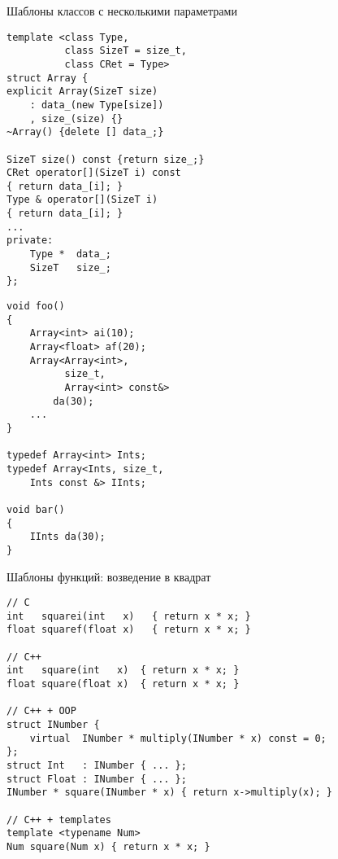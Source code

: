 \documentclass{beamer}
\begin{document}
\begin{frame}[fragile]{Шаблоны классов с несколькими параметрами}
\small
\begin{minipage}{.5\textwidth}
    \begin{lstlisting}
template <class Type, 
          class SizeT = size_t, 
          class CRet = Type>
struct Array {                               
explicit Array(SizeT size)      
    : data_(new Type[size])     
    , size_(size) {}                                                              
~Array() {delete [] data_;}            

SizeT size() const {return size_;}               
CRet operator[](SizeT i) const 
{ return data_[i]; }            
Type & operator[](SizeT i)      
{ return data_[i]; }            
...                             
private:                        
    Type *  data_;              
    SizeT   size_;              
};
    \end{lstlisting}
\end{minipage}\hspace{.03\textwidth}%
\begin{minipage}{.45\textwidth}
    \begin{lstlisting}
void foo()
{
    Array<int> ai(10);
    Array<float> af(20);
    Array<Array<int>, 
          size_t, 
          Array<int> const&> 
        da(30);
    ...
}

typedef Array<int> Ints;
typedef Array<Ints, size_t, 
    Ints const &> IInts;

void bar()
{
    IInts da(30);
}

    \end{lstlisting}
\end{minipage}
\end{frame}

\begin{frame}[fragile]{Шаблоны функций: возведение в квадрат}
\small
    \begin{lstlisting}
// C
int   squarei(int   x)   { return x * x; }
float squaref(float x)   { return x * x; }

// C++
int   square(int   x)  { return x * x; }
float square(float x)  { return x * x; }

// C++ + OOP
struct INumber {
    virtual  INumber * multiply(INumber * x) const = 0;
};
struct Int   : INumber { ... };
struct Float : INumber { ... };
INumber * square(INumber * x) { return x->multiply(x); }

// C++ + templates
template <typename Num>
Num square(Num x) { return x * x; }
    \end{lstlisting}
\end{frame}
\end{document}
